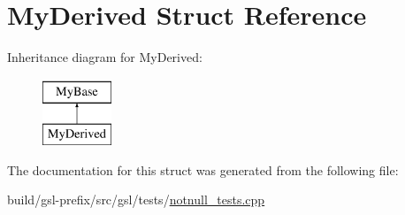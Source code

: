 \hypertarget{structMyDerived}{}\section{My\+Derived Struct Reference}
\label{structMyDerived}
Inheritance diagram for My\+Derived\+:\begin{figure}[H]
\begin{center}
\leavevmode
\includegraphics[height=2.000000cm]{structMyDerived}
\end{center}
\end{figure}


The documentation for this struct was generated from the following file\+:\begin{DoxyCompactItemize}
\item 
build/gsl-\/prefix/src/gsl/tests/\hyperlink{notnull__tests_8cpp}{notnull\+\_\+tests.\+cpp}\end{DoxyCompactItemize}
